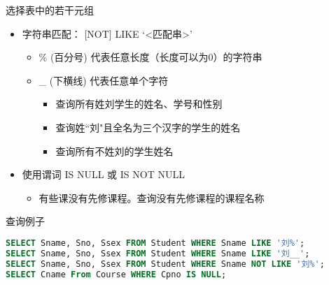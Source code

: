 \begin{frame}[fragile]{选择表中的若干元组}
\begin{itemize}
    \item 字符串匹配：  [NOT] LIKE  ‘<匹配串>’ 
    \begin{itemize}
    \item \% (百分号)  代表任意长度（长度可以为0）的字符串
    \item \_ (下横线)  代表任意单个字符
    \begin{itemize}
        \item 查询所有姓刘学生的姓名、学号和性别
        \item 查询姓“刘"且全名为三个汉字的学生的姓名
        \item 查询所有不姓刘的学生姓名
    \end{itemize}
    \end{itemize}
    \item 使用谓词 IS NULL 或 IS NOT NULL
\begin{itemize}
        \item 有些课没有先修课程。查询没有先修课程的课程名称
    \end{itemize}
\end{itemize}

\begin{block}{查询例子}
\begin{lstlisting}[language=SQL]
SELECT Sname, Sno, Ssex FROM Student WHERE Sname LIKE '刘%';
SELECT Sname, Sno, Ssex FROM Student WHERE Sname LIKE '刘__';
SELECT Sname, Sno, Ssex FROM Student WHERE Sname NOT LIKE '刘%';
SELECT Cname From Course WHERE Cpno IS NULL;

\end{lstlisting}
\end{block}
\end{frame}


